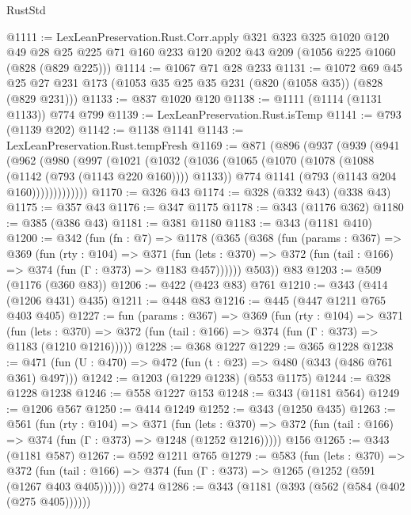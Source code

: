 \begin{lexlean}{RustStd}
\begin{coremodule}
@1111 := LexLeanPreservation.Rust.Corr.apply
    @321
    @323
    @325
    @1020
    @120
    @49
    @28
    @25
    @225
    @71
    @160
    @233
    @120
    @202
    @43
    @209
    (@1056 @225 @1060 (@828 (@829 @225)))
@1114 := @1067 @71 @28 @233
@1131 := @1072
    @69
    @45
    @25
    @27
    @231
    @173
    (@1053 @35 @25 @35 @231 (@820 (@1058 @35)) (@828 (@829 @231)))
@1133 := @837 @1020 @120
@1138 := @1111 (@1114 (@1131 @1133)) @774 @799
@1139 := LexLeanPreservation.Rust.isTemp
@1141 := @793 (@1139 @202)
@1142 := @1138 @1141
@1143 := LexLeanPreservation.Rust.tempFresh
@1169 := @871
    (@896
      (@937
        (@939
          (@941
            (@962
              (@980
                (@997
                  (@1021
                    (@1032
                      (@1036
                        (@1065
                          (@1070 (@1078 (@1088 (@1142 (@793 (@1143 @220 @160)))) @1133))
                          @774
                          @1141
                          (@793 (@1143 @204 @160)))))))))))))
@1170 := @326 @43
@1174 := @328 (@332 @43) (@338 @43)
@1175 := @357 @43
@1176 := @347 @1175
@1178 := @343 (@1176 @362)
@1180 := @385 (@386 @43)
@1181 := @381 @1180
@1183 := @343 (@1181 @410)
@1200 := @342
    (fun (fn : @7) =>
    @1178
      (@365
        (@368
          (fun (params : @367) =>
          @369
            (fun (rty : @104) =>
            @371
              (fun (lets : @370) =>
              @372 (fun (tail : @166) => @374 (fun (Γ : @373) => @1183 @457))))))
        @503))
    @83
@1203 := @509 (@1176 (@360 @83))
@1206 := @422 (@423 @83) @761
@1210 := @343 (@414 (@1206 @431) @435)
@1211 := @448 @83
@1216 := @445 (@447 @1211 @765 @403 @405)
@1227 := fun (params : @367) =>
  @369
    (fun (rty : @104) =>
    @371
      (fun (lets : @370) =>
      @372 (fun (tail : @166) => @374 (fun (Γ : @373) => @1183 (@1210 @1216)))))
@1228 := @368 @1227
@1229 := @365 @1228
@1238 := @471 (fun (U : @470) => @472 (fun (t : @23) => @480 (@343 (@486 @761 @361) @497)))
@1242 := @1203 (@1229 @1238) (@553 @1175)
@1244 := @328 @1228 @1238
@1246 := @558 @1227 @153
@1248 := @343 (@1181 @564)
@1249 := @1206 @567
@1250 := @414 @1249
@1252 := @343 (@1250 @435)
@1263 := @561
    (fun (rty : @104) =>
    @371
      (fun (lets : @370) =>
      @372 (fun (tail : @166) => @374 (fun (Γ : @373) => @1248 (@1252 @1216)))))
    @156
@1265 := @343 (@1181 @587)
@1267 := @592 @1211 @765
@1279 := @583
    (fun (lets : @370) =>
    @372 (fun (tail : @166) => @374 (fun (Γ : @373) => @1265 (@1252 (@591 (@1267 @403 @405))))))
    @274
@1286 := @343 (@1181 (@393 (@562 (@584 (@402 (@275 @405))))))

\end{coremodule}
\end{lexlean}
